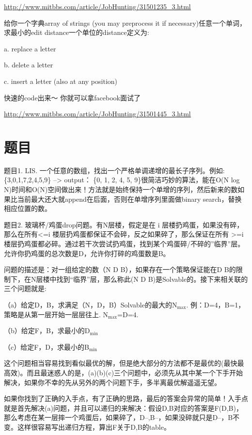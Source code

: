 \documentclass[12pt]{book}
\begin{document}
\url{http://www.mitbbs.com/article/JobHunting/31501235_3.html}

给你一个字典array of strings (you may preprocess it if necessary)任意一个单词，求最小的edit distance一个单位的distance定义为:

a. replace a letter

b. delete a letter

c. insert a letter (also at any position)

快速的code出来～ 你就可以拿facebook面试了

\url{http://www.mitbbs.com/article/JobHunting/31501445_3.html}

\section{题目}
\label{sec-19-2}

题目1. LIS. 一个任意的数组，找出一个严格单调递增的最长子序列。例如: \{3,0,1,7,2,4,5,9\} –> output： \{0, 1, 2, 4, 5, 9\}很简洁巧妙的算法，能在O(N log N)时间和O(N)空间做出来！方法就是始终保持一个单增的序列，然后新来的数如果比当前最大还大就append在后面，否则在单增序列里面做binary search，替换相应位置的数。

题目2. 玻璃杯/鸡蛋drop问题。有N层楼，假定是在 i 层楼扔鸡蛋，如果没有碎，那么在所有<=i 楼层扔鸡蛋都保证不会碎，反之如果碎了，那么保证在所有 >=i 楼层扔鸡蛋都必碎。通过若干次尝试扔鸡蛋，找到某个鸡蛋碎/不碎的”临界”层。允许你扔鸡蛋的总次数是D，允许你打碎的鸡蛋数是B。

问题的描述是：对一组给定的数（N D B），如果存在一个策略保证能在D B的限制下，在N层楼中找到“临界”层，那么称此(N D B)是Solvable的。接下来相关联的三个问题就是:

（a）给定D，B，求满足（N，D，B）Solvable的最大的N$_{\text{max}}$. 例：D=4，B=1， 策略是从第一层开始一层层往上. N$_{\text{max}}$=D=4.

（b）给定F，B，求最小的D$_{\text{min}}$

（c）给定F，D，求最小的B$_{\text{min}}$

这个问题相当容易找到看似最优的解，但是绝大部分的方法都不是最优的(最快最高效)。而且最迷惑人的是，(a)(b)(c)三个问题中，必须先从其中某一个下手开始解决，如果你不幸的先从另外的两个问题下手，多半离最优解遥遥无望。

如果你找到了正确的入手点，有了正确的思路，最后的答案会异常的简单！入手点就是首先解决(a)问题，并且可以递归的来解决：假设D,B对应的答案是F(D,B)，那么考虑在某一层摔一个鸡蛋后，如果碎了，D--,B--，如果没碎就只是D--，B不变。这样很容易写出递归方程，算出F关于D,B的table。
\end{document}
